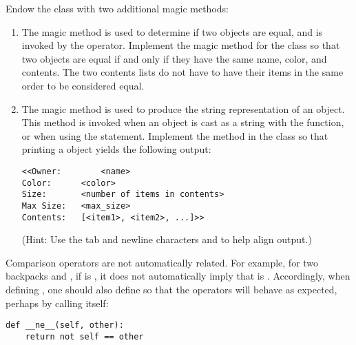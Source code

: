 \begin{problem}
Endow the  class with two additional magic methods:
\begin{enumerate}
\item The  magic method is used to determine if two objects are equal, and is invoked by the \li{==} operator.
Implement the  magic method for the  class so that two  objects are equal if and only if they have the same name, color, and contents.
The two contents lists do not have to have their items in the same order to be considered equal.

\item The  magic method is used to produce the string representation of an object.
This method is invoked when an object is cast as a string with the  function, or when using the  statement.
Implement the  method in the  class so that printing a  object yields the following output:
\begin{lstlisting}
<<Owner:		<name>
Color:		<color>
Size:       <number of items in contents>
Max Size:   <max_size>
Contents:   [<item1>, <item2>, ...]>>
\end{lstlisting}
(Hint: Use the tab and newline characters  and  to help align output.)
\end{enumerate}
\end{problem}

\begin{warn}
Comparison operators are not automatically related.
For example, for two backpacks  and , if  is , it does not automatically imply that  is .
Accordingly, when defining , one should also define  so that the operators will behave as expected, perhaps by calling  itself:
\begin{lstlisting}
def __ne__(self, other):
    return not self == other
\end{lstlisting}
\end{warn}


